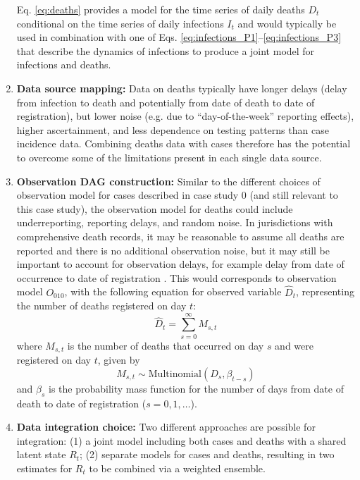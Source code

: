 \documentclass{article}
\begin{document}
\begin{enumerate}
    Eq. \eqref{eq:deaths} provides a model for the time series of daily deaths $D_t$ conditional on the time series of daily infections $I_t$ and would typically be used in combination with one of Eqs. \eqref{eq:infections_P1}--\eqref{eq:infections_P3} that describe the dynamics of infections to produce a joint model for infections and deaths. 
    \item \textbf{Data source mapping:} Data on deaths typically have longer delays (delay from infection to death and potentially from date of death to date of registration), but lower noise (e.g. due to ``day-of-the-week'' reporting effects), higher ascertainment, and less dependence on testing patterns than case incidence data. Combining deaths data with cases therefore has the potential to overcome some of the limitations present in each single data source. 
    \item \textbf{Observation DAG construction:} Similar to the different choices of observation model for cases described in case study 0 (and still relevant to this case study), the observation model for deaths could include underreporting, reporting delays, and random noise. In jurisdictions with comprehensive death records, it may be reasonable to assume all deaths are reported and there is no additional observation noise, but it may still be important to account for observation delays, for example delay from date of occurrence to date of registration \citep{seaman2022nowcasting}. 
    This would corresponds to observation model $O_{010}$, with the following equation for observed variable $\hat{D}_t$, representing the number of deaths registered on day $t$:
\begin{equation}
    \hat{D}_t = \sum_{s=0}^\infty M_{s,t}
\end{equation}
where $M_{s,t}$ is the number of deaths that occurred on day $s$ and were registered on day $t$, given by
\begin{equation}
    M_{s,t} \sim \mathrm{Multinomial}\left( D_s, \beta_{t-s}\right) 
\end{equation}
and $\beta_s$ is the probability mass function for the number of days from date of death to date of registration ($s=0,1,\ldots$).
    
    \item \textbf{Data integration choice:} 
       Two different approaches are possible for integration: (1) a joint model including both cases and deaths with a shared latent state $R_t$; (2) separate models for cases and deaths, resulting in two estimates for $R_t$ to be combined via a weighted ensemble. 
       

\end{enumerate}
\end{document}
